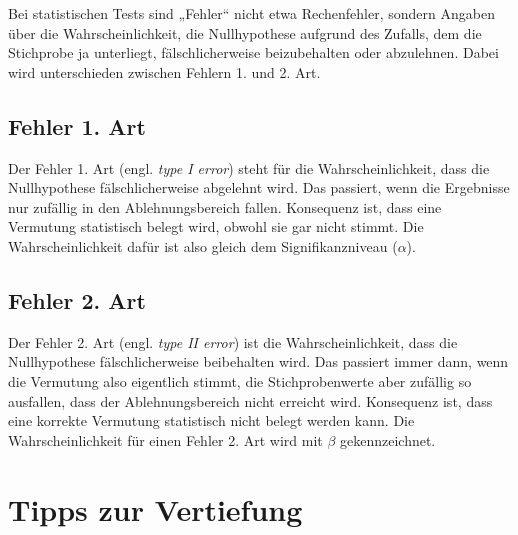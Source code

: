 \documentclass[
  11pt,
  ngerman,
  a4paper,
]{report}
\begin{document}
Bei statistischen Tests sind „Fehler`` nicht etwa Rechenfehler, sondern Angaben über die Wahrscheinlichkeit, die Nullhypothese aufgrund des Zufalls, dem die Stichprobe ja unterliegt, fälschlicherweise beizubehalten oder abzulehnen. Dabei wird unterschieden zwischen Fehlern 1. und 2. Art.

\hypertarget{fehler-1.-art}{%
\subsection{Fehler 1. Art}\label{fehler-1.-art}}

Der Fehler 1. Art (engl. \emph{type I error}) steht für die Wahrscheinlichkeit, dass die Nullhypothese fälschlicherweise abgelehnt wird. Das passiert, wenn die Ergebnisse nur zufällig in den Ablehnungsbereich fallen. Konsequenz ist, dass eine Vermutung statistisch belegt wird, obwohl sie gar nicht stimmt. Die Wahrscheinlichkeit dafür ist also gleich dem Signifikanzniveau (\(\alpha\)).

\hypertarget{fehler-2.-art}{%
\subsection{Fehler 2. Art}\label{fehler-2.-art}}

Der Fehler 2. Art (engl. \emph{type II error}) ist die Wahrscheinlichkeit, dass die Nullhypothese fälschlicherweise beibehalten wird. Das passiert immer dann, wenn die Vermutung also eigentlich stimmt, die Stichprobenwerte aber zufällig so ausfallen, dass der Ablehnungsbereich nicht erreicht wird. Konsequenz ist, dass eine korrekte Vermutung statistisch nicht belegt werden kann. Die Wahrscheinlichkeit für einen Fehler 2. Art wird mit \(\beta\) gekennzeichnet.

\hypertarget{tipps-zur-vertiefung-5}{%
\section*{Tipps zur Vertiefung}\label{tipps-zur-vertiefung-5}}
\end{document}
